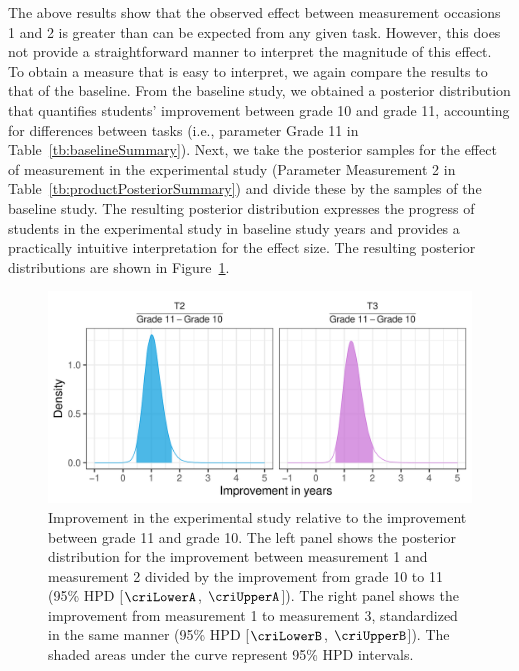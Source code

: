 \documentclass[a4paper]{article}
\newcommand{\setVal}[4]{%
	\pgfplotstablegetelem{#1}{#2}\of{#3}%
	\pgfmathprintnumberto{\pgfplotsretval}{#4}%
}
\begin{document}
The above results show that the observed effect between measurement occasions 1 and 2 is greater than can be expected from any given task.
However, this does not provide a straightforward manner to interpret the magnitude of this effect.
To obtain a measure that is easy to interpret, we again compare the results to that of the baseline.
From the baseline study, we obtained a posterior distribution that quantifies students' improvement between grade 10 and grade 11, accounting for differences between tasks (i.e., parameter Grade 11 in Table~\ref{tb:baselineSummary}).
Next, we take the posterior samples for the effect of measurement in the experimental study (Parameter Measurement 2 in Table~\ref{tb:productPosteriorSummary}) and divide these by the samples of the baseline study.
The resulting posterior distribution expresses the progress of students in the experimental study in baseline study years and provides a practically intuitive interpretation for the effect size.
The resulting posterior distributions are shown in Figure~\ref{fig:improvementInYears}.

\tbCRIimprovement
\setVal{0}{Lower}{\tbCRIimprovement}{\criLowerA}
\setVal{0}{Upper}{\tbCRIimprovement}{\criUpperA}
\setVal{1}{Lower}{\tbCRIimprovement}{\criLowerB}
\setVal{1}{Upper}{\tbCRIimprovement}{\criUpperB}
\begin{figure}[!ht]
	\includegraphics[width=\textwidth]{improvementInYears.pdf}
	\caption{Improvement in the experimental study relative to the improvement between grade 11 and grade 10. The left panel shows the posterior distribution for the improvement between measurement 1 and measurement 2 divided by the improvement from grade 10 to 11 (95\% HPD [$\criLowerA$, $\criUpperA$]). The right panel shows the improvement from measurement 1 to measurement 3, standardized in the same manner (95\% HPD [$\criLowerB$, $\criUpperB$]). The shaded areas under the curve represent 95\% HPD intervals.}
	\label{fig:improvementInYears}
\end{figure}
\end{document}
